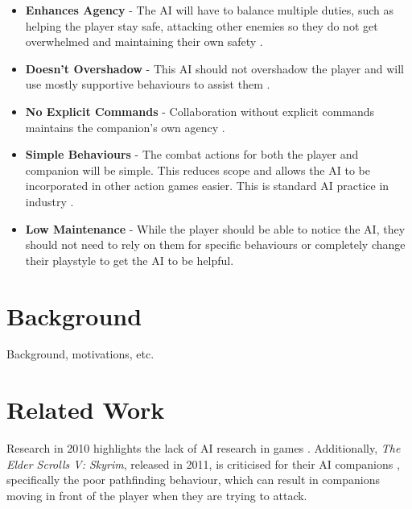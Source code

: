 \documentclass{IEEEtran}
\begin{document}
\label{CoreDesign}
\begin{itemize}
	\item \textbf{Enhances Agency} - The AI will have to balance multiple duties, such as helping the player stay safe, attacking other enemies so they do not get overwhelmed and maintaining their own safety \cite{CoupledEmpowermentMaximisation, tremblay2013adaptive}.
	\item \textbf{Doesn't Overshadow} - This AI should not overshadow the player and will use mostly supportive behaviours to assist them \cite{CoupledEmpowermentMaximisation, DesignDocAIAllies}.
	\item \textbf{No Explicit Commands} - Collaboration without explicit commands maintains the companion's own agency \cite{EGXCharacterDeathGuildWars}.
	\item \textbf{Simple Behaviours} - The combat actions for both the player and companion will be simple. This reduces scope and allows the AI to be incorporated in other action games easier. This is standard AI practice in industry \cite{GMTGoodAI, GDCLessIsMore, GDCSimplestAITrick}.
	\item \textbf{Low Maintenance} - While the player should be able to notice the AI, they should not need to rely on them for specific behaviours or completely change their playstyle to get the AI to be helpful.
\end{itemize}

\section{Background}
\label{Background}

Background, motivations, etc.

\section{Related Work}
\label{RelatedWork}

Research in 2010 highlights the lack of AI research in games \cite{RealTimeAICritique2010}. Additionally, \textit{The Elder Scrolls V: Skyrim}, released in 2011, is criticised for their AI companions \cite{tremblay2013adaptive}, specifically the poor pathfinding behaviour, which can result in companions moving in front of the player when they are trying to attack.

\end{document}
